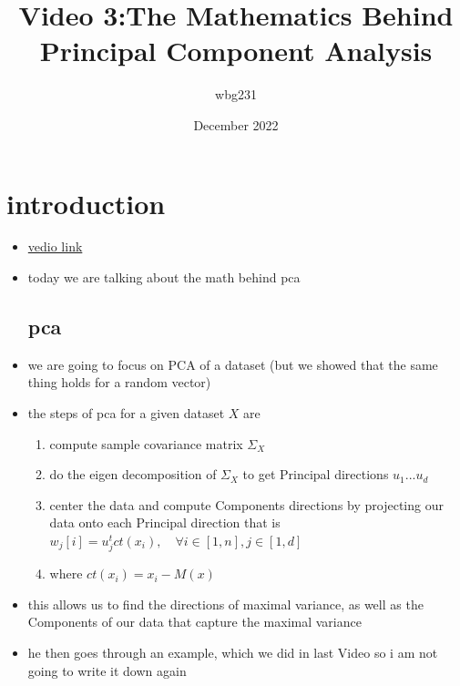 \documentclass{article}
\title{Video 3:The Mathematics Behind Principal Component Analysis }
\author{wbg231 }
\date{December 2022}
\begin{document}
\maketitle

\section*{introduction}
\begin{itemize}
\item \href{https://www.youtube.com/watch?v=l9qIW_UBiZs}{vedio link}
\item today we are talking about the math behind pca
\subsection*{pca}
\item we are going to focus on PCA of a dataset (but we showed that the same thing holds for a random vector)
\item the steps of pca for a given dataset $X$ are 
\begin{enumerate}
    \item compute sample covariance matrix $\Sigma_{X}$
    \item do the eigen decomposition of $\Sigma_{X}$ to get Principal directions $u_1...u_d$
    \item center the data and compute Components directions by projecting our data onto each Principal direction that is $w_j[i]=u_{j}^{t}ct(x_i), \quad \forall i\in [1,n], j\in [1,d]$
    \item where $ct(x_i)=x_i-M(x)$
\end{enumerate}
\item this allows us to find the directions of maximal variance, as well as the Components of our data that capture the maximal variance
\item he then goes through an example, which we did in last Video so i am not going to write it down again 

\end{itemize}
\end{document}
